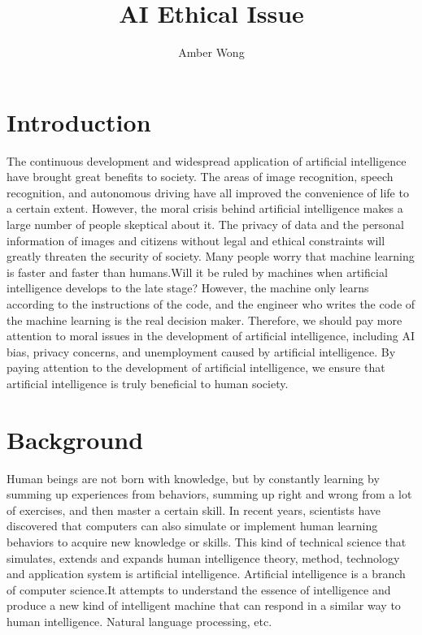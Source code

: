 \documentclass[12pt]{article}  %
\begin{document}
\title{AI Ethical Issue}
\author{Amber Wong}
\maketitle                     %
\section{Introduction}
The continuous development and widespread application of artificial intelligence have brought great benefits to society. The areas of image recognition, speech recognition, and autonomous driving have all improved the convenience of life to a certain extent. However, the moral crisis behind artificial intelligence makes a large number of people skeptical about it. The privacy of data and the personal information of images and citizens without legal and ethical constraints will greatly threaten the security of society. \newline\newline
Many people worry that machine learning is faster and faster than humans.Will it be ruled by machines when artificial intelligence develops to the late stage? However, the machine only learns according to the instructions of the code, and the engineer who writes the code of the machine learning is the real decision maker. Therefore, we should pay more attention to moral issues in the development of artificial intelligence, including AI bias, privacy concerns, and unemployment caused by artificial intelligence. By paying attention to the development of artificial intelligence, we ensure that artificial intelligence is truly beneficial to human society.
\section{Background}
Human beings are not born with knowledge, but by constantly learning by summing up experiences from behaviors,  summing up right and wrong from a lot of exercises, and then master a certain skill. In recent years, scientists have discovered that computers can also simulate or implement human learning behaviors to acquire new knowledge or skills. \newline\newline
This kind of technical science that simulates, extends and expands human intelligence theory, method, technology and application system is artificial intelligence. Artificial intelligence is a branch of computer science.It attempts to understand the essence of intelligence and produce a new kind of intelligent machine that can respond in a similar way to human intelligence. Natural language processing, etc.
\end{document}
